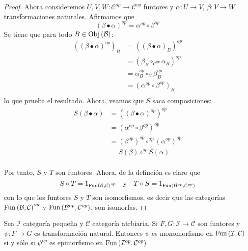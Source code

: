 \documentclass[12pt]{report}
\theoremstyle{largebreak}
\newcommand\cf[3]{\ensuremath{#1:#2\rightarrow#3}}
\newcommand{\Obj}[1]{\ensuremath{\textup{Obj}\left(#1\right)}}
\newcommand{\Fun}[2]{\ensuremath{\textup{Fun}\left(#1,#2\right)}}
\begin{document}
\begin{proof}
        Ahora consideremos $\cf{U,V,W}{\mathcal{C}^{op}}{\mathcal{C}^{op}}$ funtores y $\cf{\alpha}{U}{V}$, $\cf{\beta}{V}{W}$ transformaciones naturales. Afirmamos que
        \begin{equation*}
            (\beta\bullet\alpha)^{op}=\alpha^{op}\circ\beta^{op}
        \end{equation*}
        Se tiene que para todo $B\in\Obj{\mathcal{B}}$:
        \begin{equation*}
            \begin{split}
                ((\beta\bullet\alpha)^{op})_B&=((\beta\bullet\alpha)_B)^{op}\\
                &=(\beta_B\circ_{\mathcal{C}^{op}}\alpha_B)^{op}\\
                &=\alpha_B^{op}\circ_\mathcal{C}\beta_B^{op}\\
                &=(\alpha^{op}\circ\beta^{op})_B\\
            \end{split}
        \end{equation*}
        lo que prueba el resultado. Ahora, veamos que $S$ saca composiciones:
        \begin{equation*}
            \begin{split}
                S(\beta\bullet\alpha)&=((\beta\bullet\alpha)^{op})^{\overline{op}}\\
                &=(\alpha^{op}\circ\beta^{op})^{\overline{op}}\\
                &=(\beta^{op})^{\overline{op}}\circ^{op}(\alpha^{op})^{\overline{op}}\\
                &=S(\beta)\circ^{op}S(\alpha)\\
            \end{split}
        \end{equation*}

        Por tanto, $S$ y $T$ son funtores. Ahora, de la definción es claro que
        \begin{equation*}
            S\circ T=1_{\Fun{\mathcal{B}}{\mathcal{C}}^{op}}\quad\textup{y}\quad T\circ S=1_{\Fun{\mathcal{B}^{op}}{\mathcal{C}^{op}}}
        \end{equation*}
        con lo que los funtores $S$ y $T$ son isomorfismos, es decir que las categorías $\Fun{\mathcal{B}}{\mathcal{C}}^{op}$ y $\Fun{\mathcal{B}^{op}}{\mathcal{C}^{op}}$, son isomorfas.
    \end{proof}

    \begin{cor}
        Sea $\mathcal{I}$ categoría pequeña y $\mathcal{C}$ categoría atrbiaria. Si $\cf{F,G}{\mathcal{I}}{\mathcal{C}}$ son funtores y $\cf{\psi}{F}{G}$ es transformación natural. Entonces $\psi$ es monomorfismo en $\Fun{\mathcal{I}}{\mathcal{C}}$ si y sólo si $\psi^{op}$ es epimorfismo en $\Fun{\mathcal{I}^{op}}{\mathcal{C}^{op}}$.
    \end{cor}
\end{document}
